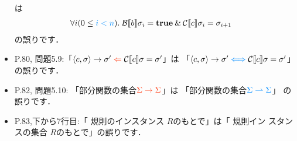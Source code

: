 \documentclass[12pt,titlepage,twoside,openright,dvipdfmx]{jsbook}
\newcommand\old[1]{%
  \textcolor[rgb]{1.0,0.25,0.1}{#1}%
  }
\newcommand\new[1]{%
  \textcolor[rgb]{0,0.55,1.0}{#1}%
  }
\theoremstyle{definition}
\begin{document}
\begin{itemize}
    は
    \begin{align*}
      & \forall{i(0\leq \new{i < n})}.\;
        \denotation{B}{b}\sigma_i=\mathbf{true}\AND
        \denotation{C}{c}\sigma_i=\sigma_{i+1}
    \end{align*}
    の誤りです．
  \item P.80,
    問題5.9:「$\tuple{c,\sigma}\rightarrow\sigma'\old{{}\Leftarrow{}}
    \denotation{C}{c}\sigma=\sigma'$」は
    「$\tuple{c,\sigma}\rightarrow\sigma' \new{\iff}
    \denotation{C}{c}\sigma=\sigma'$」の誤りです．
  \item P.82, 問題5.10:
    「部分関数の集合$\old{\Sigma\rightarrow\Sigma}$」は
    「部分関数の集合$\new{\Sigma\PARTIAL\Sigma}$」
    の誤りです．
  \item P.83,下から7行目:「\old{規則のインスタンス}$R$のもとで」は「\new{規則イン
      スタンスの集合}$R$のもとで」の誤りです．
    \fi
    \fi


\end{itemize}
\end{document}
